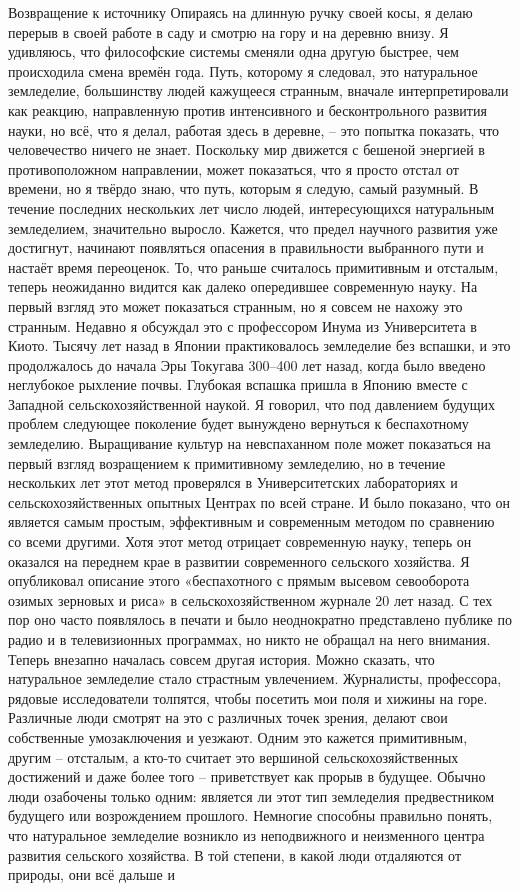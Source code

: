 \documentclass[a4paper]{book}
\begin{document}
Возвращение к источнику
Опираясь на длинную ручку своей косы, я делаю перерыв в своей работе в саду и
смотрю на гору и на деревню внизу. Я удивляюсь, что философские системы сменяли одна
другую быстрее, чем происходила смена времён года.
Путь, которому я следовал, это натуральное земледелие, большинству людей кажущееся
странным, вначале интерпретировали как реакцию, направленную против интенсивного и
бесконтрольного развития науки, но всё, что я делал, работая здесь в деревне, – это попытка
показать, что человечество ничего не знает. Поскольку мир движется с бешеной энергией в
противоположном направлении, может показаться, что я просто отстал от времени, но я
твёрдо знаю, что путь, которым я следую, самый разумный.
В течение последних нескольких лет число людей, интересующихся натуральным
земледелием, значительно выросло. Кажется, что предел научного развития уже достигнут,
начинают появляться опасения в правильности выбранного пути и настаёт время
переоценок. То, что раньше считалось примитивным и отсталым, теперь неожиданно
видится как далеко опередившее современную науку. На первый взгляд это может показаться
странным, но я совсем не нахожу это странным.
Недавно я обсуждал это с профессором Инума из Университета в Киото. Тысячу лет
назад в Японии практиковалось земледелие без вспашки, и это продолжалось до начала Эры
Токугава 300–400 лет назад, когда было введено неглубокое рыхление почвы. Глубокая
вспашка пришла в Японию вместе с Западной сельскохозяйственной наукой. Я говорил, что
под давлением будущих проблем следующее поколение будет вынуждено вернуться к
беспахотному земледелию.
Выращивание культур на невспаханном поле может показаться на первый взгляд
возращением к примитивному земледелию, но в течение нескольких лет этот метод
проверялся в Университетских лабораториях и сельскохозяйственных опытных Центрах по
всей стране. И было показано, что он является самым простым, эффективным и
современным методом по сравнению со всеми другими. Хотя этот метод отрицает
современную науку, теперь он оказался на переднем крае в развитии современного сельского
хозяйства.
Я опубликовал описание этого «беспахотного с прямым высевом севооборота озимых
зерновых и риса» в сельскохозяйственном журнале 20 лет назад. С тех пор оно часто
появлялось в печати и было неоднократно представлено публике по радио и в телевизионных
программах, но никто не обращал на него внимания.
Теперь внезапно началась совсем другая история. Можно сказать, что натуральное
земледелие стало страстным увлечением. Журналисты, профессора, рядовые исследователи
толпятся, чтобы посетить мои поля и хижины на горе. Различные люди смотрят на это с
различных точек зрения, делают свои собственные умозаключения и уезжают. Одним это
кажется примитивным, другим – отсталым, а кто-то считает это вершиной
сельскохозяйственных достижений и даже более того – приветствует как прорыв в будущее.
Обычно люди озабочены только одним: является ли этот тип земледелия предвестником
будущего или возрождением прошлого. Немногие способны правильно понять, что
натуральное земледелие возникло из неподвижного и неизменного центра развития
сельского хозяйства. В той степени, в какой люди отдаляются от природы, они всё дальше и
\end{document}
